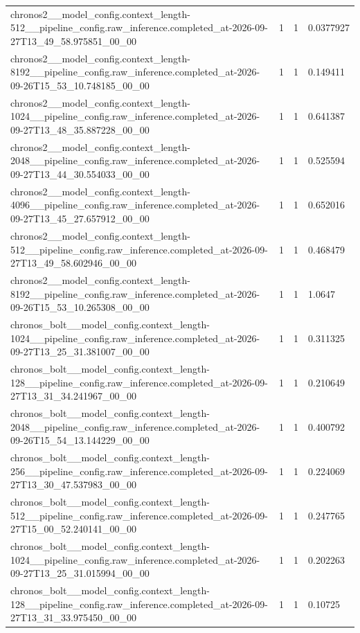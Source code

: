 \begin{tabular}{llll}
chronos2\_\_model\_config.context\_length-512\_\_pipeline\_config.raw\_inference.completed\_at-2026-09-27T13\_49\_58.975851\_00\_00 & 1 & 1 & 0.0377927 \\
chronos2\_\_model\_config.context\_length-8192\_\_pipeline\_config.raw\_inference.completed\_at-2026-09-26T15\_53\_10.748185\_00\_00 & 1 & 1 & 0.149411 \\
chronos2\_\_model\_config.context\_length-1024\_\_pipeline\_config.raw\_inference.completed\_at-2026-09-27T13\_48\_35.887228\_00\_00 & 1 & 1 & 0.641387 \\
chronos2\_\_model\_config.context\_length-2048\_\_pipeline\_config.raw\_inference.completed\_at-2026-09-27T13\_44\_30.554033\_00\_00 & 1 & 1 & 0.525594 \\
chronos2\_\_model\_config.context\_length-4096\_\_pipeline\_config.raw\_inference.completed\_at-2026-09-27T13\_45\_27.657912\_00\_00 & 1 & 1 & 0.652016 \\
chronos2\_\_model\_config.context\_length-512\_\_pipeline\_config.raw\_inference.completed\_at-2026-09-27T13\_49\_58.602946\_00\_00 & 1 & 1 & 0.468479 \\
chronos2\_\_model\_config.context\_length-8192\_\_pipeline\_config.raw\_inference.completed\_at-2026-09-26T15\_53\_10.265308\_00\_00 & 1 & 1 & 1.0647 \\
chronos\_bolt\_\_model\_config.context\_length-1024\_\_pipeline\_config.raw\_inference.completed\_at-2026-09-27T13\_25\_31.381007\_00\_00 & 1 & 1 & 0.311325 \\
chronos\_bolt\_\_model\_config.context\_length-128\_\_pipeline\_config.raw\_inference.completed\_at-2026-09-27T13\_31\_34.241967\_00\_00 & 1 & 1 & 0.210649 \\
chronos\_bolt\_\_model\_config.context\_length-2048\_\_pipeline\_config.raw\_inference.completed\_at-2026-09-26T15\_54\_13.144229\_00\_00 & 1 & 1 & 0.400792 \\
chronos\_bolt\_\_model\_config.context\_length-256\_\_pipeline\_config.raw\_inference.completed\_at-2026-09-27T13\_30\_47.537983\_00\_00 & 1 & 1 & 0.224069 \\
chronos\_bolt\_\_model\_config.context\_length-512\_\_pipeline\_config.raw\_inference.completed\_at-2026-09-27T15\_00\_52.240141\_00\_00 & 1 & 1 & 0.247765 \\
chronos\_bolt\_\_model\_config.context\_length-1024\_\_pipeline\_config.raw\_inference.completed\_at-2026-09-27T13\_25\_31.015994\_00\_00 & 1 & 1 & 0.202263 \\
chronos\_bolt\_\_model\_config.context\_length-128\_\_pipeline\_config.raw\_inference.completed\_at-2026-09-27T13\_31\_33.975450\_00\_00 & 1 & 1 & 0.10725 \\

\end{tabular}
